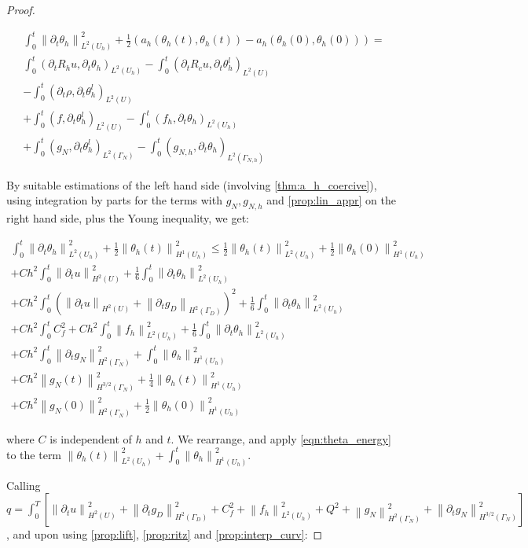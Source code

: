 \documentclass[english,a4paper,10pt,oneside]{scrbook}	%
\theoremstyle{break}
\newenvironment{mproof}[1][\proofname]{%
  \begin{proof}[#1]$ $\par\nobreak\ignorespaces
}{%
  \end{proof}
}
\renewcommand*{\proofname}{Proof}
\theoremstyle{remark}
\newcommand{\ds}{\displaystyle}
\newcommand{\norm}[1]{\left\lVert#1\right\rVert}
\begin{document}
\begin{appendices}
\begin{mproof}
\begin{align*}
\int_0^t\norm{\partial_t \theta_h}^2_{L^2(U_h)} + \frac{1}{2} \left ( a_h(\theta_h(t), \theta_h(t)) - a_h(\theta_h(0), \theta_h(0))\right ) = \\
\int_0^t(\partial_t R_h u , \partial_t\theta_h)_{L^2(U_h)} - \int_0^t(\partial_t R_c u , \partial_t\theta_h^l)_{L^2(U)}\\
- \int_0^t(\partial_t \rho, \partial_t\theta_h^l)_{L^2(U)}\\ + \int_0^t(f, \partial_t\theta_h^l)_{L^2(U)} - \int_0^t(f_h, \partial_t\theta_h)_{L^2(U_h)}\\ + \int_0^t(g_{N}, \partial_t\theta_h^l)_{L^2(\Gamma_{N})} - \int_0^t(g_{N,h}, \partial_t\theta_h)_{L^2(\Gamma_{N,h})} 
\end{align*}

By suitable estimations of the left hand side (involving \cref{thm:a_h_coercive}), using integration by parts for the terms with $g_N, g_{N,h}$ and \cref{prop:lin_appr} on the right hand side, plus the Young inequality, we get: 


\begin{align*}
\int_0^t\norm{\partial_t \theta_h}^2_{L^2(U_h)} + \frac{1}{2} \norm{\theta_h(t)}_{H^1(U_h)}^2 \leq  \frac{1}{2} \norm{\theta_h(t)}_{L^2(U_h)}^2 + \frac{1}{2} \norm{\theta_h(0)}_{H^1(U_h)}^2\\
+ Ch^2\int_0^t \norm{\partial_t u}_{H^2(U)}^2 + \frac{1}{6}\int_0^t\norm{\partial_t \theta_h}^2_{L^2(U_h)}\\
+ Ch^2\int_0^t(\norm{\partial_t u}_{H^2(U)}+	\norm{\partial_t g_D}_{H^2(\Gamma_D)})^2 + \frac{1}{6} \int_0^t\norm{\partial_t \theta_h}_{L^2(U_h)}^2\\
+ Ch^2\int_0^t C_f^2+ Ch^2\int_0^t \norm{f_h}_{L^2(U_h)}^2  + \frac{1}{6}\int_0^t\norm{\partial_t \theta_h}^2_{L^2(U_h)}\\ 
+ Ch^2\int_0^t \norm{\partial_t g_N}_{H^2(\Gamma_N)}^2 + \int_0^t \norm{ \theta_h}_{H^1(U_h)}^2\\
+ Ch^2\norm{g_N(t)}_{H^{3/2}(\Gamma_N)}^2 + \frac{1}{4}\norm{ \theta_h(t)}_{H^1(U_h)}^2\\
+ Ch^2\norm{g_N(0)}_{H^2(\Gamma_N)}^2 + \frac{1}{2}\norm{ \theta_h(0)}_{H^1(U_h)}^2
\end{align*}


where $C$ is independent of $h$ and $t$. We rearrange, and apply \cref{eqn:theta_energy} to the term $\ds \norm{ \theta_h(t)}^2_{L^2(U_h)} + \int_0^t \norm{ \theta_h}_{H^1(U_h)}^2$. 

Calling $q=\ds \int_0^T \left [ \norm{\partial_t u}_{H^2(U)}^2 +	\norm{\partial_t g_D}_{H^2(\Gamma_D)}^2 + C_f^2 +  \norm{f_h}_{L^2(U_h)}^2 + Q^2+ \norm{g_N}_{H^{2}(\Gamma_N)}^2 + \norm{\partial_t g_N}_{H^{3/2}(\Gamma_N)}^2 \right ] $, and upon using \cref{prop:lift}, \cref{prop:ritz} and \cref{prop:interp_curv}:


\end{mproof}
\end{appendices}
\end{document}
